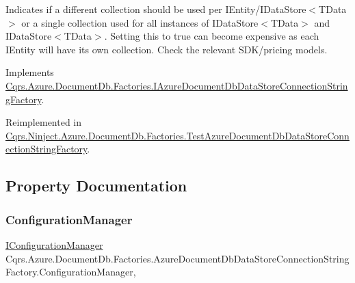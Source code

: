 Indicates if a different collection should be used per I\+Entity/I\+Data\+Store$<$\+T\+Data$>$ or a single collection used for all instances of I\+Data\+Store$<$\+T\+Data$>$ and I\+Data\+Store$<$\+T\+Data$>$. Setting this to true can become expensive as each I\+Entity will have it\textquotesingle{}s own collection. Check the relevant S\+D\+K/pricing models. 



Implements \hyperlink{interfaceCqrs_1_1Azure_1_1DocumentDb_1_1Factories_1_1IAzureDocumentDbDataStoreConnectionStringFactory_ae500b0191fee202806701e4f856c43dd_ae500b0191fee202806701e4f856c43dd}{Cqrs.\+Azure.\+Document\+Db.\+Factories.\+I\+Azure\+Document\+Db\+Data\+Store\+Connection\+String\+Factory}.



Reimplemented in \hyperlink{classCqrs_1_1Ninject_1_1Azure_1_1DocumentDb_1_1Factories_1_1TestAzureDocumentDbDataStoreConnectionStringFactory_aeac8ecfdbb2d1d7f18105f2e535c51fe_aeac8ecfdbb2d1d7f18105f2e535c51fe}{Cqrs.\+Ninject.\+Azure.\+Document\+Db.\+Factories.\+Test\+Azure\+Document\+Db\+Data\+Store\+Connection\+String\+Factory}.



\subsection{Property Documentation}
\mbox{\label{classCqrs_1_1Azure_1_1DocumentDb_1_1Factories_1_1AzureDocumentDbDataStoreConnectionStringFactory_a7d0a40bb03e9e15306023bf97094cf60_a7d0a40bb03e9e15306023bf97094cf60}} 
\subsubsection{\texorpdfstring{Configuration\+Manager}{ConfigurationManager}}
{\footnotesize\ttfamily \hyperlink{interfaceCqrs_1_1Configuration_1_1IConfigurationManager}{I\+Configuration\+Manager} Cqrs.\+Azure.\+Document\+Db.\+Factories.\+Azure\+Document\+Db\+Data\+Store\+Connection\+String\+Factory.\+Configuration\+Manager\hspace{0.3cm}{\ttfamily [get]}, {\ttfamily [protected]}}



